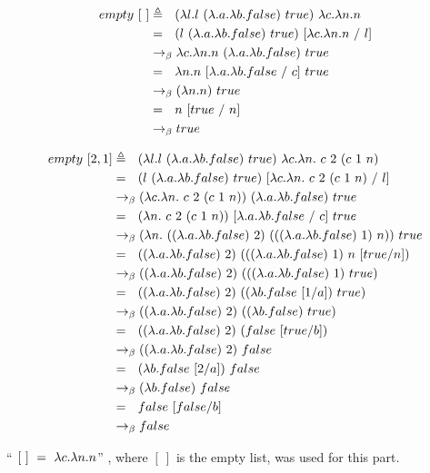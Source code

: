 \documentclass{article}
\begin{document}
\begin{Large}
		\begin{align*}
			empty \ [ \ ] &\triangleq \, \, \, \, (\lambda l.l \ (\lambda .a.\lambda b.false) \ true) \ \lambda c.\lambda n.n \\
			&= \, \, \, \, (l \ (\lambda .a.\lambda b.false) \ true) \ [\lambda c.\lambda n.n \ / \ l] \\
			&\rightarrow_\beta \lambda c.\lambda n.n \ (\lambda .a.\lambda b.false) \ true \\
			&= \, \, \, \, \lambda n.n \ [\lambda .a.\lambda b.false \ / \ c] \ true \\
			&\rightarrow_\beta (\lambda n.n) \ true \\
			&= \, \, \, \, n \ [true \ / \ n] \\
			&\rightarrow_\beta true
		\end{align*}
		
		\begin{align*}
			empty \ [2,1] &\triangleq \saq (\la l.l \ (\la .a.\la b.false) \ true) \ \la c.\la n. \ c \ 2 \ (c \ 1 \ n) \\
			&= \saq (l \ (\la .a.\la b.false) \ true) \ [\la c.\la n. \ c \ 2 \ (c \ 1 \ n) \ / \ l] \\
			&\equals (\la c.\la n. \ c \ 2 \ (c \ 1 \ n)) \ (\la .a.\la b.false) \ true \\
			&= \saq (\la n. \ c \ 2 \ (c \ 1 \ n)) \ [\la .a.\la b.false \ / \ c] \ true \\
			&\equals (\la n. \ ((\la .a.\la b.false) \ 2) \ (((\la .a.\la b.false) \ 1) \ n)) \ true \\
			&= \saq ((\la .a.\la b.false) \ 2) \ (((\la .a.\la b.false) \ 1) \ n \ [true/n]) \\
			&\equals ((\la .a.\la b.false) \ 2) \ (((\la .a.\la b.false) \ 1) \ true) \\
			&= \saq ((\la .a.\la b.false) \ 2) \ ((\la b.false \ [1/a]) \ true) \\
			&\equals ((\la .a.\la b.false) \ 2) \ ((\la b.false) \ true) \\
			&=\saq ((\la .a.\la b.false) \ 2) \ (false \ [true/b]) \\
			&\equals ((\la .a.\la b.false) \ 2) \ false \\
			&= \saq (\la b.false \ [2/a]) \ false \\
			&\equals (\la b.false) \ false \\
			&= \saq false \ [false/b] \\
			&\equals false
		\end{align*}
		\newline
		
		``$ \ [ \ ] \ = \ \lambda c.\lambda n.n$'' , where $[ \ ]$ is the empty list, was used for this part.
		
	\end{Large}
	\newpage
\end{document}
